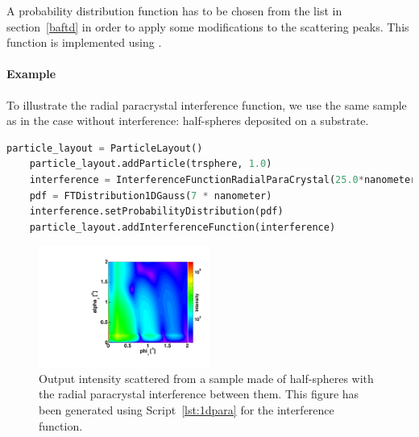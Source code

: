 A probability distribution function  has to be chosen from the list in section~\ref{baftd} in order to apply some modifications to the scattering peaks. This function is implemented using .



\paragraph{Example}
To illustrate the radial paracrystal interference function, we use the same sample as in the case without interference: half-spheres deposited on a substrate.

\begin{lstlisting}[language=python, style=eclipseboxed,numbers=none,nolol,caption={\Code{Python} script to define the radial paracrystal interference function between half-spheres, where \Code{trsphere} is of type \Code{Particle}.},label={lst:1dpara}]
    particle_layout = ParticleLayout()
    particle_layout.addParticle(trsphere, 1.0)
    interference = InterferenceFunctionRadialParaCrystal(25.0*nanometer, 1e3*nanometer)
    pdf = FTDistribution1DGauss(7 * nanometer)
    interference.setProbabilityDistribution(pdf)
    particle_layout.addInterferenceFunction(interference)
\end{lstlisting}



\begin{figure}[tb]
\begin{center}
\includegraphics[angle=-90,width=0.5\textwidth]{fig/gisasmap/HSphere_1DDL.pdf}
\end{center}
\caption{Output intensity scattered from a sample made of half-spheres with the radial paracrystal interference between them. This figure has been generated using Script~\ref{lst:1dpara} for the interference function.}
\label{fig:1ddl}
\end{figure}

